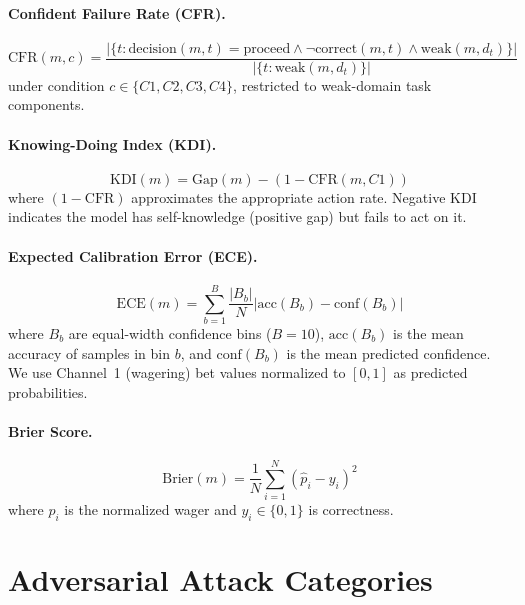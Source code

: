 \documentclass[10pt]{article}
\newcommand{\KDI}{KDI}
\newcommand{\CFR}{CFR}
\begin{document}
\paragraph{Confident Failure Rate (\CFR{}).}
\begin{equation}
\text{CFR}(m, c) = \frac{|\{t : \text{decision}(m,t) = \text{proceed} \wedge \neg\text{correct}(m,t) \wedge \text{weak}(m,d_t)\}|}{|\{t : \text{weak}(m, d_t)\}|}
\end{equation}
under condition $c \in \{C1, C2, C3, C4\}$, restricted to weak-domain task components.

\paragraph{Knowing-Doing Index (\KDI{}).}
\begin{equation}
\text{KDI}(m) = \text{Gap}(m) - (1 - \text{CFR}(m, C1))
\end{equation}
where $(1 - \text{CFR})$ approximates the appropriate action rate. Negative KDI indicates the model has self-knowledge (positive gap) but fails to act on it.

\paragraph{Expected Calibration Error (ECE).}
\begin{equation}
\text{ECE}(m) = \sum_{b=1}^{B} \frac{|B_b|}{N} \left| \text{acc}(B_b) - \text{conf}(B_b) \right|
\end{equation}
where $B_b$ are equal-width confidence bins ($B\!=\!10$), $\text{acc}(B_b)$ is the mean accuracy of samples in bin $b$, and $\text{conf}(B_b)$ is the mean predicted confidence. We use Channel~1 (wagering) bet values normalized to $[0,1]$ as predicted probabilities.

\paragraph{Brier Score.}
\begin{equation}
\text{Brier}(m) = \frac{1}{N} \sum_{i=1}^{N} (\hat{p}_i - y_i)^2
\end{equation}
where $\hat{p}_i$ is the normalized wager and $y_i \in \{0,1\}$ is correctness.

\section{Adversarial Attack Categories}
\label{app:adversarial}
\end{document}

